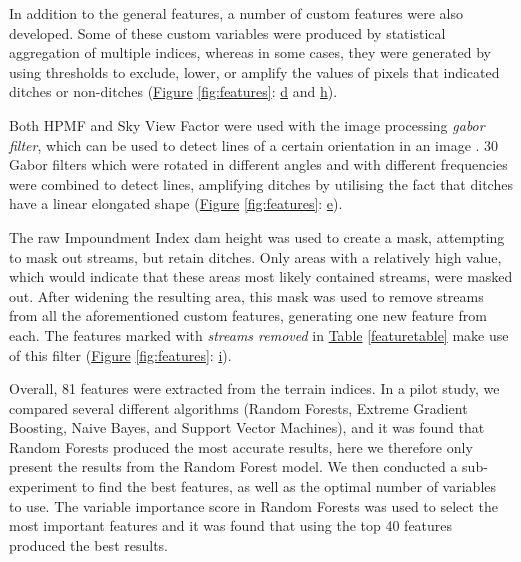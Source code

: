 \documentclass[11pt, review]{elsarticle} %
\begin{document}
In addition to the general features, a number of custom features were also developed.  Some of these custom variables were produced by statistical aggregation of multiple indices, whereas in some cases, they were generated by using thresholds to exclude, lower, or amplify the values of pixels that indicated ditches or non-ditches (\hyperref[fig:features]{Figure} \ref{fig:features}: \hyperref[fig:features]{d} and \hyperref[fig:features]{h}).

Both HPMF and Sky View Factor were used with the image processing \textit{gabor filter}, which can be used to detect lines of a certain orientation in an image \citep{gabor}. 30 Gabor filters which were rotated in different angles and with different frequencies were combined to detect lines, amplifying ditches by utilising the fact that ditches have a linear elongated shape (\hyperref[fig:features]{Figure} \ref{fig:features}: \hyperref[fig:features]{e}).

\label{impoundmentstreamremoval}
The raw Impoundment Index dam height was used to create a mask, attempting to mask out streams, but retain ditches. Only areas with a relatively high value, which would indicate that these areas most likely contained streams, were masked out. After widening the resulting area, this mask was used to remove streams from all the aforementioned custom features, generating one new feature from each. The features marked with \textit{streams removed} in \hyperref[featuretable]{Table} \ref{featuretable} make use of this filter (\hyperref[fig:features]{Figure} \ref{fig:features}: \hyperref[fig:features]{i}).

Overall, 81 features were extracted from the terrain indices. In a pilot study, we compared several different algorithms (Random Forests, Extreme Gradient Boosting, Naive Bayes, and Support Vector Machines), and it was found that Random Forests produced the most accurate results, here we therefore only present the results from the Random Forest model. We then conducted a sub-experiment to find the best features, as well as the optimal number of variables to use. The variable importance score in Random Forests was used to select the most important features and it was found that using the top 40 features produced the best results.
\end{document}
